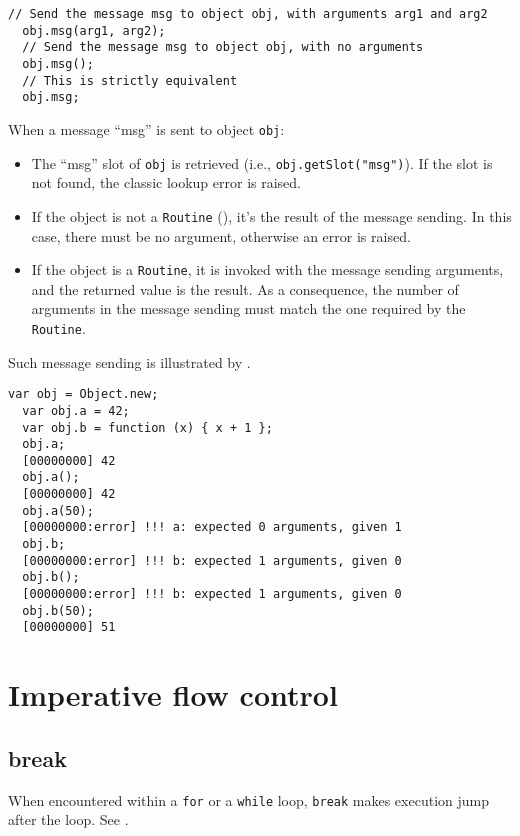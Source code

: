 \documentclass[openright,twoside,12pt]{report}
\begin{document}
\begin{lstlisting}[caption=Sending messages, label=lst:messages,
  float=\floatpos]
  // Send the message msg to object obj, with arguments arg1 and arg2
  obj.msg(arg1, arg2);
  // Send the message msg to object obj, with no arguments
  obj.msg();
  // This is strictly equivalent
  obj.msg;
\end{lstlisting}

When a message ``msg'' is sent to object \lstinline|obj|:

\begin{itemize}
\item The ``msg'' slot of \lstinline|obj| is retrieved (i.e.,
  \lstinline|obj.getSlot("msg")|). If the slot is not found, the
  classic lookup error is raised.
\item If the object is not a \lstinline|Routine| (), it's
  the result of the message sending. In this case, there must be no
  argument, otherwise an error is raised.
\item If the object is a \lstinline|Routine|, it is invoked with the
  message sending arguments, and the returned value is the result. As
  a consequence, the number of arguments in the message sending must
  match the one required by the \lstinline|Routine|.
\end{itemize}

Such message sending is illustrated by .

\begin{lstlisting}[caption=Sending messages, label=lst:send-message,
  float=\floatpos]
  var obj = Object.new;
  var obj.a = 42;
  var obj.b = function (x) { x + 1 };
  obj.a;
  [00000000] 42
  obj.a();
  [00000000] 42
  obj.a(50);
  [00000000:error] !!! a: expected 0 arguments, given 1
  obj.b;
  [00000000:error] !!! b: expected 1 arguments, given 0
  obj.b();
  [00000000:error] !!! b: expected 1 arguments, given 0
  obj.b(50);
  [00000000] 51
\end{lstlisting}

\FloatBarrier
\section{Imperative flow control}

\subsection{break}

When encountered within a \lstinline|for| or a \lstinline|while| loop,
\lstinline|break| makes execution jump after the loop. See
.
\end{document}
